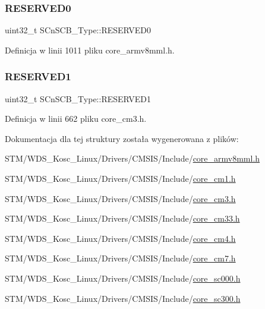 \subsubsection{\texorpdfstring{R\+E\+S\+E\+R\+V\+E\+D0}{RESERVED0}}
{\footnotesize\ttfamily uint32\+\_\+t S\+Cn\+S\+C\+B\+\_\+\+Type\+::\+R\+E\+S\+E\+R\+V\+E\+D0}



Definicja w linii 1011 pliku core\+\_\+armv8mml.\+h.

\mbox{\label{struct_s_cn_s_c_b___type_a0bce3f86e9f6e00085cf5a126ae201c6}} 
\subsubsection{\texorpdfstring{R\+E\+S\+E\+R\+V\+E\+D1}{RESERVED1}}
{\footnotesize\ttfamily uint32\+\_\+t S\+Cn\+S\+C\+B\+\_\+\+Type\+::\+R\+E\+S\+E\+R\+V\+E\+D1}



Definicja w linii 662 pliku core\+\_\+cm3.\+h.



Dokumentacja dla tej struktury została wygenerowana z plików\+:\begin{DoxyCompactItemize}
\item 
S\+T\+M/\+W\+D\+S\+\_\+\+Kosc\+\_\+\+Linux/\+Drivers/\+C\+M\+S\+I\+S/\+Include/\hyperlink{core__armv8mml_8h}{core\+\_\+armv8mml.\+h}\item 
S\+T\+M/\+W\+D\+S\+\_\+\+Kosc\+\_\+\+Linux/\+Drivers/\+C\+M\+S\+I\+S/\+Include/\hyperlink{core__cm1_8h}{core\+\_\+cm1.\+h}\item 
S\+T\+M/\+W\+D\+S\+\_\+\+Kosc\+\_\+\+Linux/\+Drivers/\+C\+M\+S\+I\+S/\+Include/\hyperlink{core__cm3_8h}{core\+\_\+cm3.\+h}\item 
S\+T\+M/\+W\+D\+S\+\_\+\+Kosc\+\_\+\+Linux/\+Drivers/\+C\+M\+S\+I\+S/\+Include/\hyperlink{core__cm33_8h}{core\+\_\+cm33.\+h}\item 
S\+T\+M/\+W\+D\+S\+\_\+\+Kosc\+\_\+\+Linux/\+Drivers/\+C\+M\+S\+I\+S/\+Include/\hyperlink{core__cm4_8h}{core\+\_\+cm4.\+h}\item 
S\+T\+M/\+W\+D\+S\+\_\+\+Kosc\+\_\+\+Linux/\+Drivers/\+C\+M\+S\+I\+S/\+Include/\hyperlink{core__cm7_8h}{core\+\_\+cm7.\+h}\item 
S\+T\+M/\+W\+D\+S\+\_\+\+Kosc\+\_\+\+Linux/\+Drivers/\+C\+M\+S\+I\+S/\+Include/\hyperlink{core__sc000_8h}{core\+\_\+sc000.\+h}\item 
S\+T\+M/\+W\+D\+S\+\_\+\+Kosc\+\_\+\+Linux/\+Drivers/\+C\+M\+S\+I\+S/\+Include/\hyperlink{core__sc300_8h}{core\+\_\+sc300.\+h}\end{DoxyCompactItemize}
